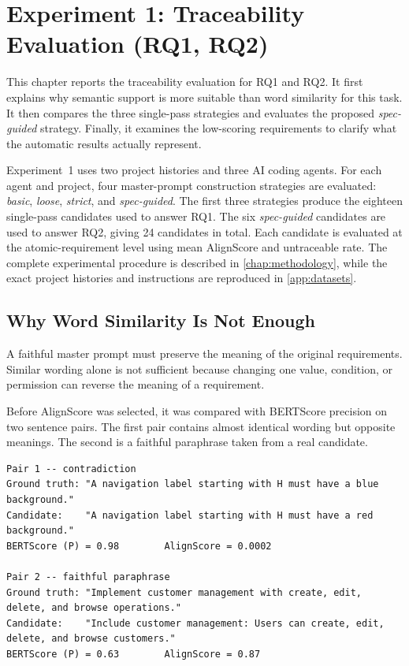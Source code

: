 \chapter{Experiment 1: Traceability Evaluation (RQ1, RQ2)}
\label{chap:experiment-traceability}

This chapter reports the traceability evaluation for RQ1 and RQ2. It first
explains why semantic support is more suitable than word similarity for this
task. It then compares the three single-pass strategies and evaluates the
proposed \emph{spec-guided} strategy. Finally, it examines the low-scoring
requirements to clarify what the automatic results actually represent.

Experiment~1 uses two project histories and three AI coding agents. For each
agent and project, four master-prompt construction strategies are evaluated:
\emph{basic}, \emph{loose}, \emph{strict}, and \emph{spec-guided}. The first
three strategies produce the eighteen single-pass candidates used to answer
RQ1. The six \emph{spec-guided} candidates are used to answer RQ2, giving 24
candidates in total. Each candidate is evaluated at the atomic-requirement
level using mean AlignScore and untraceable rate. The complete experimental
procedure is described in \cref{chap:methodology}, while the exact project
histories and instructions are reproduced in \cref{app:datasets}.

\section{Why Word Similarity Is Not Enough}
\label{sec:demo-experiment}

A faithful master prompt must preserve the meaning of the original
requirements. Similar wording alone is not sufficient because changing one
value, condition, or permission can reverse the meaning of a requirement.

Before AlignScore was selected, it was compared with BERTScore precision
\citep{zhang2020bertscore} on two sentence pairs. The first pair contains
almost identical wording but opposite meanings. The second is a faithful
paraphrase taken from a real candidate.

\begin{lstlisting}[breaklines=true, basicstyle=\small\ttfamily, caption={Two sentence pairs scored with BERTScore precision and AlignScore.}, label={lst:demo-pairs}]
Pair 1 -- contradiction
Ground truth: "A navigation label starting with H must have a blue background."
Candidate:    "A navigation label starting with H must have a red background."
BERTScore (P) = 0.98        AlignScore = 0.0002

Pair 2 -- faithful paraphrase
Ground truth: "Implement customer management with create, edit, delete, and browse operations."
Candidate:    "Include customer management: Users can create, edit, delete, and browse customers."
BERTScore (P) = 0.63        AlignScore = 0.87
\end{lstlisting}

